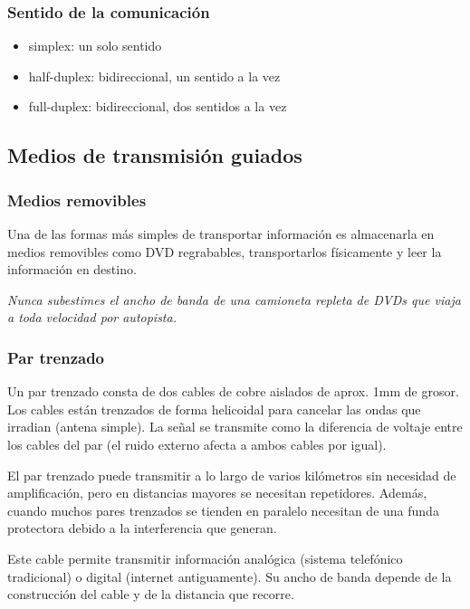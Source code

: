 \documentclass{book}
\begin{document}
	\subsubsection{Sentido de la comunicación}
	\begin{itemize}
		\item simplex: un solo sentido
		\item half-duplex: bidireccional, un sentido a la vez
		\item full-duplex: bidireccional, dos sentidos a la vez
	\end{itemize}
	
	\subsection{Medios de transmisión guiados}
	
	\subsubsection{Medios removibles}
	Una de las formas más simples de transportar información es almacenarla en medios removibles como DVD regrabables, transportarlos físicamente y leer la información en destino.
	
	\begin{center}
		\textit{Nunca subestimes el ancho de banda de una camioneta repleta de DVDs que viaja a toda velocidad por autopista.}
	\end{center}
	
	\subsubsection{Par trenzado}
	Un par trenzado consta de dos cables de cobre aislados de aprox. 1mm de grosor. Los cables están trenzados de forma helicoidal para cancelar las ondas que irradian (antena simple). La señal se transmite como la diferencia de voltaje entre los cables del par (el ruido externo afecta a ambos cables por igual).
	
	\vspace{3mm}
	El par trenzado puede transmitir a lo largo de varios kilómetros sin necesidad de amplificación, pero en distancias mayores se necesitan repetidores. Además, cuando muchos pares trenzados se tienden en paralelo necesitan de una funda protectora debido a la interferencia que generan.
	
	\vspace{3mm}
	Este cable permite transmitir información analógica (sistema telefónico tradicional) o digital (internet antiguamente). Su ancho de banda depende de la construcción del cable y de la distancia que recorre.
	
\end{document}
